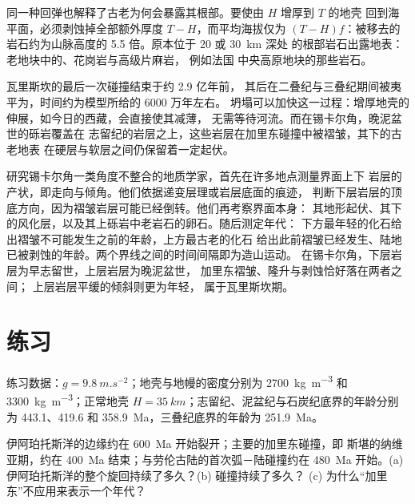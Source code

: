 同一种回弹也解释了古老为何会暴露其根部。要使由 $H$ 增厚到 $T$ 的地壳
回到海平面，必须剥蚀掉全部额外厚度 $T - H$，而平均海拔仅为
$(T - H)f$：被移去的岩石约为山脉高度的 5.5 倍。原本位于 20 或 \qty{30}{km} 深处
的根部岩石出露地表：老地块中的、花岗岩与高级片麻岩，
例如法国
中央高原地块的那些岩石。

瓦里斯坎的最后一次碰撞结束于约 2.9 亿年前，
其后在二叠纪与三叠纪期间被夷平为，时间约为模型所给的 6000 万年左右。
坍塌可以加快这一过程：增厚地壳的伸展，如今日的西藏，会直接使其减薄，
无需等待河流。而在锡卡尔角，晚泥盆世的砾岩覆盖在
志留纪的岩层之上，这些岩层在加里东碰撞中被褶皱，其下的古老地表
在硬层与软层之间仍保留着一定起伏。

\begin{inthefield}[读懂角度不整合]
研究锡卡尔角一类角度不整合的地质学家，首先在许多地点测量界面上下
岩层的产状，即走向与倾角。他们依据递变层理或岩层底面的痕迹，
判断下层岩层的顶底方向，因为褶皱岩层可能已经倒转。他们再考察界面本身：
其地形起伏、其下的风化层，以及其上砾岩中老岩石的卵石。随后测定年代：
下方最年轻的化石给出褶皱不可能发生之前的年龄，上方最古老的化石
给出此前褶皱已经发生、陆地已被剥蚀的年龄。两个界线之间的时间间隔即为造山运动。
在锡卡尔角，下层岩层为早志留世，上层岩层为晚泥盆世，
加里东褶皱、隆升与剥蚀恰好落在两者之间；
上层岩层平缓的倾斜则更为年轻，
属于瓦里斯坎期。
\end{inthefield}

\section*{练习}\label{sec:b2:wilson-cycle:exercises}

练习数据：$g = \qty{9.8}{m.s^{-2}}$；地壳与地幔的密度分别为
\qty{2700}{kg.m^{-3}} 和 \qty{3300}{kg.m^{-3}}；正常地壳 $H = \qty{35}{km}$；志留纪、泥盆纪与石炭纪底界的年龄分别为
443.1、419.6 和 \qty{358.9}{Ma}，三叠纪底界的年龄为
\qty{251.9}{Ma}。

\begin{exercise}[$\star$]\label{exo:b2:wilson-cycle:1}
伊阿珀托斯洋的边缘约在 \qty{600}{Ma} 开始裂开；主要的加里东碰撞，即
斯堪的纳维亚期，约在 \qty{400}{Ma} 结束；与劳伦古陆的首次弧－陆碰撞约在
\qty{480}{Ma} 开始。(a) 伊阿珀托斯洋的整个旋回持续了多久？(b) 碰撞持续了多久？
(c) 为什么“加里东”不应用来表示一个年代？
\end{exercise}

